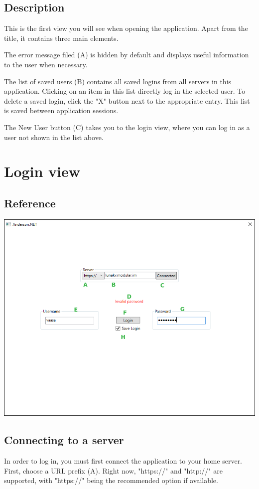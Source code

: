 \documentclass[titlepage]{scrartcl}
\begin{document}
\subsection{Description}
This is the first view you will see when opening the application. Apart from the title, it contains three main elements.

The error message filed (A) is hidden by default and displays useful information to the user when necessary.

The list of saved users (B) contains all saved logins from all servers in this application. Clicking on an item in this list directly log in the selected user. To delete a saved login, click the "X" button next to the appropriate entry. This list is saved between application sessions.

The New User button (C) takes you to the login view, where you can log in as a user not shown in the list above.
\section{Login view}
\subsection{Reference}
\begin{center}
    \includegraphics[width=410pt]{login-window.png}
\end{center}

\subsection{Connecting to a server}
In order to log in, you must first connect the application to your home server. First, choose a URL prefix (A). Right now, "https://" and "http://" are supported, with "https://" being the recommended option if available. 
\end{document}
